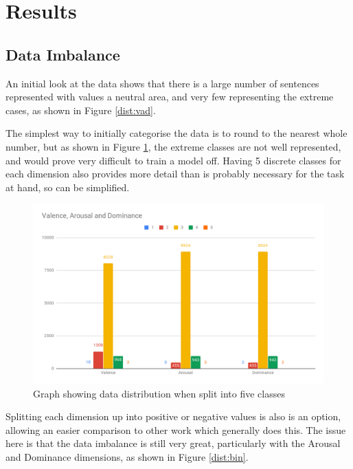 \section{Results}

\subsection{Data Imbalance}
An initial look at the data shows that there is a large number of sentences represented with values a neutral area, and very few representing the extreme cases, as shown in Figure \ref{dist:vad}.

The simplest way to initially categorise the data is to round to the nearest whole number, but as shown in Figure \ref{dist:5cat}, the extreme classes are not well represented, and would prove very difficult to train a model off. Having 5 discrete classes for each dimension also provides more detail than is probably necessary for the task at hand, so can be simplified.

\begin{figure}[h]
\centering
\includegraphics[scale=0.3]{graphs/5catDist.png}
\caption{Graph showing data distribution when split into five classes}
\label{dist:5cat}
\end{figure}

Splitting each dimension up into positive or negative values is also is an option, allowing an easier comparison to other work which generally does this. The issue here is that the data imbalance is still very great, particularly with the Arousal and Dominance dimensions, as shown in Figure \ref{dist:bin}.

